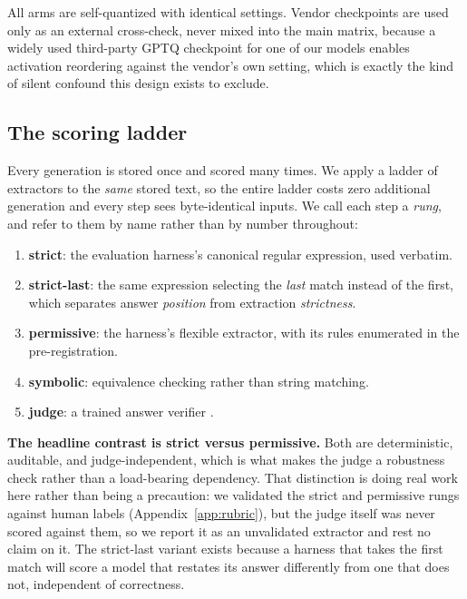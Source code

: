 \documentclass[conference]{IEEEtran}
\begin{document}
All arms are self-quantized with identical settings. Vendor checkpoints are used
only as an external cross-check, never mixed into the main matrix, because a
widely used third-party GPTQ checkpoint for one of our models enables activation
reordering against the vendor's own setting, which is exactly the kind of silent
confound this design exists to exclude.

\subsection{The scoring ladder}
\label{sec:ladder}
Every generation is stored once and scored many times. We apply a ladder of
extractors to the \emph{same} stored text, so the entire ladder costs zero
additional generation and every step sees byte-identical inputs. We call each step a
\emph{rung}, and refer to them by name rather than by number throughout:

\begin{enumerate}\itemsep0pt
  \item \textbf{strict}: the evaluation harness's canonical regular
    expression, used verbatim.
  \item \textbf{strict-last}: the same expression selecting the
    \emph{last} match instead of the first, which separates answer
    \emph{position} from extraction \emph{strictness}.
  \item \textbf{permissive}: the harness's flexible extractor, with its rules
    enumerated in the pre-registration.
  \item \textbf{symbolic}: equivalence checking rather than string matching.
  \item \textbf{judge}: a trained answer verifier \citep{chen2025xverify}.
\end{enumerate}

\textbf{The headline contrast is strict versus permissive.} Both are deterministic,
auditable, and judge-independent, which is what makes the judge a robustness check
rather than a load-bearing dependency. That distinction is doing real work here rather
than being a precaution: we validated the strict and permissive rungs against human
labels (Appendix~\ref{app:rubric}), but the judge itself was never scored against them, so
we report it as an unvalidated extractor and rest no claim on it. The strict-last variant exists because a harness that takes the first match will
score a model that restates its answer differently from one that does not,
independent of correctness.
\end{document}
